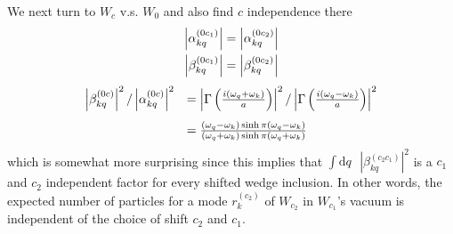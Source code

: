 \documentclass[12pt,a4paper]{article}
\newcommand{\dv}[1]{\mathrm{d} #1 \text{ }}
\begin{document}
We next turn to $W_c$ v.s. $W_0$ and also find $c$ independence there 
\begin{equation}
  \begin{array}{c}
    \left|\alpha_{kq}^{(0c_1)}\right| = \left|\alpha_{kq}^{(0c_2)}\right| \vspace{4pt}\\
    \left|\beta_{kq}^{(0c_1)}\right| = \left|\beta_{kq}^{(0c_2)}\right| \\
  \end{array}
\end{equation}
\begin{equation}
  \begin{array}{ll}
      \left|\beta_{kq}^{(0c)}\right|^2 / \left|\alpha_{kq}^{(0c)}\right|^2 \vspace{4pt} &= \left|\Gamma\left(\frac{i(\omega_q + \omega_k)}{a}\right)\right|^2 / \left|\Gamma\left(\frac{i(\omega_q - \omega_k)}{a}\right)\right|^2 \vspace{4pt} \\
  & = \frac{(\omega_q - \omega_k) \sinh \pi (\omega_q - \omega_k)}{(\omega_q + \omega_k) \sinh \pi (\omega_q + \omega_k)} \\
  \end{array}
  \label{nonzero_ratio}
\end{equation}
which is somewhat more surprising since this implies that $\int \dv{q} \left|\beta_{kq}^{(c_2c_1)}\right|^2$ is a $c_1$ and $c_2$ independent factor  for every shifted wedge inclusion.  In other words, the expected number of particles for a mode $r^{(c_2)}_k$ of $W_{c_2}$ in $W_{c_1}$'s vacuum is independent of the choice of shift $c_2$ and $c_1$.
\end{document}
